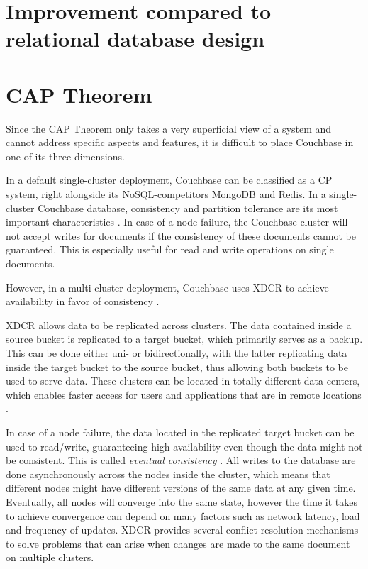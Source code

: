 \section{Improvement compared to relational database design}

\section{\ac{CAP} Theorem}

Since the \ac{CAP} Theorem only takes a very superficial view of a system and cannot address specific aspects and features, it is difficult to place Couchbase in one of its three dimensions.

In a default single-cluster deployment, Couchbase can be classified as a CP system, right alongside its NoSQL-competitors MongoDB and Redis. In a single-cluster Couchbase database, consistency and partition tolerance are its most important characteristics \parencite{Ostrovsky.2015}. In case of a node failure, the Couchbase cluster will not accept writes for documents if the consistency of these documents cannot be guaranteed. This is especially useful for read and write operations on single documents.

However, in a multi-cluster deployment, Couchbase uses \ac{XDCR} to achieve availability in favor of consistency \parencite{CAPXDCR.2014}.

\ac{XDCR} allows data to be replicated across clusters. The data contained inside a source bucket is replicated to a target bucket, which primarily serves as a backup. This can be done either uni- or bidirectionally, with the latter replicating data inside the target bucket to the source bucket, thus allowing both buckets to be used to serve data. These clusters can be located in totally different data centers, which enables faster access for users and applications that are in remote locations \parencite{XDCR.20230402}.

In case of a node failure, the data located in the replicated target bucket can be used to read/write, guaranteeing high availability even though the data might not be consistent. This is called \textit{eventual consistency} \parencite{DonPintoPrincipalProductManager.2014}. All writes to the database are done asynchronously across the nodes inside the cluster, which means that different nodes might have different versions of the same data at any given time. Eventually, all nodes will converge into the same state, however the time it takes to achieve convergence can depend on many factors such as network latency, load and frequency of updates. \ac{XDCR} provides several conflict resolution mechanisms to solve problems that can arise when changes are made to the same document on multiple clusters.

